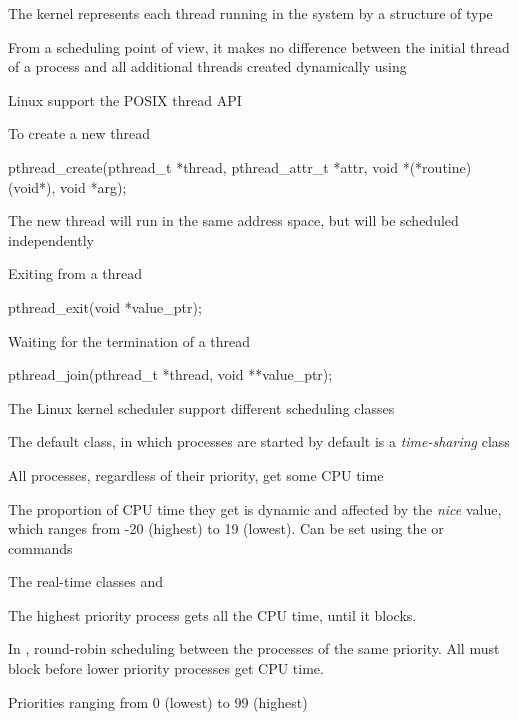   \startitemize
  \item The kernel represents each thread running in the system by a structure of
    type 
  \item From a scheduling point of view, it makes no difference
    between the initial thread of a process and all additional threads
    created dynamically using 
  \stopitemize

  \startitemize
  \item Linux support the POSIX thread API
  \item To create a new thread
    \begin{block}{}
\small
\starttyping
pthread_create(pthread_t *thread, pthread_attr_t *attr,
               void *(*routine)(void*), void *arg);
\stoptyping
    \end{block}
  \item The new thread will run in the same address space, but will be
    scheduled independently
  \item Exiting from a thread
    \begin{block}{}
\small
\starttyping
pthread_exit(void *value_ptr);
\stoptyping
    \end{block}
  \item Waiting for the termination of a thread
    \begin{block}{}
\small
\starttyping
pthread_join(pthread_t *thread, void **value_ptr);
\stoptyping
    \end{block}
  \stopitemize

  \startitemize
  \item The Linux kernel scheduler support different scheduling
    classes
  \item The default class, in which processes are started by default
    is a {\em time-sharing} class
    \startitemize
    \item All processes, regardless of their priority, get some CPU time
    \item The proportion of CPU time they get is dynamic and affected
      by the {\em nice} value, which ranges from -20 (highest) to 19
      (lowest). Can be set using the  or  commands
    \stopitemize
  \item The real-time classes  and 
    \startitemize
    \item The highest priority process gets all the CPU time, until it
      blocks.
    \item In , round-robin scheduling between the
      processes of the same priority. All must block before lower
      priority processes get CPU time.
    \item Priorities ranging from 0 (lowest) to 99 (highest)
    \stopitemize
  \stopitemize

